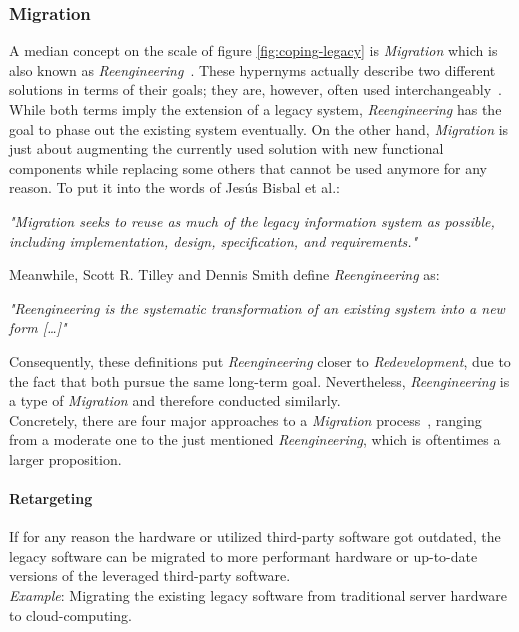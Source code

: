 \documentclass[12pt,a4paper,twoside]{report}
\begin{document}
\subsubsection{Migration}

A median concept on the scale of figure \ref{fig:coping-legacy} is \textit{Migration}
which is also known as \textit{Reengineering}~\cite{tilley-perspectives-reengineering}.
These hypernyms actually describe two different solutions in terms of their goals;
they are, however, often used interchangeably~\cite{bisbal-legacy-issues}.
While both terms imply the extension of a legacy system, \textit{Reengineering}
has the goal to phase out the existing system eventually.
On the other hand, \textit{Migration} is just about augmenting the currently used
solution with new functional components while replacing some others that cannot be used anymore
for any reason. To put it into the words of Jesús Bisbal et al.:
\begin{displayquote}
\emph{"Migration seeks to reuse as much of the legacy information system as possible,
including implementation, design, specification, and requirements."}~\cite{bisbal-legacy-issues}
\end{displayquote}
Meanwhile, Scott R. Tilley and Dennis Smith define \textit{Reengineering} as:
\begin{displayquote}
\emph{"Reengineering is the systematic transformation of an existing system
into a new form […]"}~\cite{tilley-perspectives-reengineering}
\end{displayquote}
Consequently, these definitions put \textit{Reengineering} closer to \textit{Redevelopment},
due to the fact that both pursue the same long-term goal.
Nevertheless, \textit{Reengineering} is a type of \textit{Migration} and
therefore conducted similarly.\\
Concretely, there are four major approaches to a \textit{Migration}
process~\cite{malinova-legacy-techniques, seacord-modernizing-legacy},
ranging from a moderate one to the just mentioned \textit{Reengineering},
which is oftentimes a larger proposition.

\paragraph{Retargeting}
If for any reason the hardware or utilized third-party software got outdated,
the legacy software can be migrated to more performant hardware or
up-to-date versions of the leveraged third-party software.\\
\textit{Example}: Migrating the existing legacy software from traditional server
hardware to cloud-computing.
\end{document}
